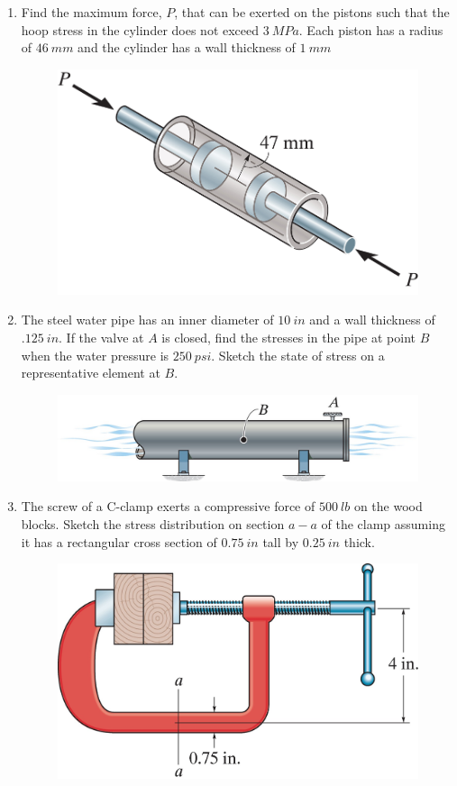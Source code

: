 \documentclass[12pt, oneside]{article}
\let\US\SI
\begin{document}
\begin{enumerate}
	\item %
		Find the maximum force, $P$, that can be exerted on the pistons such that the hoop stress in the cylinder does not exceed $\SI{3}{MPa}$.
		Each piston has a radius of $\SI{46}{mm}$ and the cylinder has a wall thickness of $\SI{1 }{mm}$
		\begin{figure}[H]
			\centering
			\includegraphics[width=0.6\linewidth]{8-6}
		\end{figure}

	\item %
		The steel water pipe has an inner diameter of $ 	\US{10}{in}  $ and a wall thickness of $ 	\US{.125}{in}  $.
		If the valve at $A$ is closed, find the stresses in the pipe at point $B$ when the water pressure is $ 	\US{250}{psi}  $.
		Sketch the state of stress on a representative element at $B$.
		\begin{figure}[H]
			\centering
			\includegraphics[width=0.6\linewidth]{8-9}
		\end{figure}
		\newpage

	\item %
		The screw of a C-clamp exerts a compressive force of $ 	\US{500}{lb}  $ on the wood blocks.
		Sketch the stress distribution on section $a-a$ of the clamp assuming it has a rectangular cross section of $ 	\US{0.75}{in}  $ tall by $ 	\US{0.25 }{in }  $ thick.
		\begin{figure}[H]
			\centering
			\includegraphics[width=0.6\linewidth]{8-27}
		\end{figure}


\end{enumerate}
\end{document}
